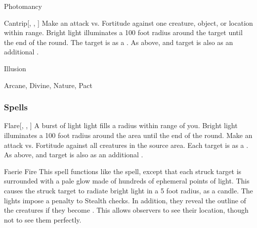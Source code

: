 \newpage
\begin{spellsection}{Photomancy}


\begin{ability}{Cantrip}[, , ]
Make an attack vs. Fortitude against one creature, object, or location within \rngmed range.
Bright light illuminates a 100 foot radius around the target until the end of the round.
\hit The target is \dazzled as a .
\crit As above, and target is also \dazed as an additional .
\end{ability}




 Illusion

 Arcane, Divine, Nature, Pact
\end{spellsection}


\subsubsection{Spells}


\lowercase{\hypertarget{spell:Flare}{}}\label{spell:Flare}
\begin{ability}[\nth{1}]{\hypertarget{spell:Flare}{Flare}}[, , ]
A burst of light light fills a \areasmall radius within \rngmed range of you.
Bright light illuminates a 100 foot radius around the area until the end of the round.
Make an attack vs. Fortitude against all creatures in the source area.
\hit Each target is \dazzled as a .
\crit As above, and target is also \dazed as an additional .
\end{ability}
\vspace{0.25em}



\lowercase{\hypertarget{spell:Faerie Fire}{}}\label{spell:Faerie Fire}
\begin{ability}[\nth{2}]{\hypertarget{spell:Faerie Fire}{Faerie Fire}}
This spell functions like the  spell, except that each struck target is surrounded with a pale glow made of hundreds of ephemeral points of light.
This causes the struck target to radiate bright light in a 5 foot radius, as a candle.
The lights impose a  penalty to Stealth checks.
In addition, they reveal the outline of the creatures if they become .
This allows observers to see their location, though not to see them perfectly.
\end{ability}
\vspace{0.25em}



